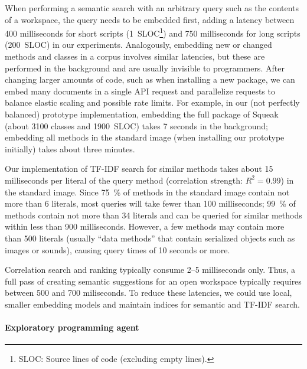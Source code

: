 When performing a semantic search with an arbitrary query such as the contents of a workspace, the query needs to be embedded first, adding a latency between 400 milliseconds for short scripts (\qty{1}{SLOC}\footnote{SLOC: Source lines of code (excluding empty lines).}) and 750 milliseconds for long scripts (\qty{200}{SLOC}) in our experiments.
Analogously, embedding new or changed methods and classes in a corpus involves similar latencies, but these are performed in the background and are usually invisible to programmers.
After changing larger amounts of code, such as when installing a new package, we can embed many documents in a single API request and parallelize requests to balance elastic scaling and possible rate limits.
For example, in our (not perfectly balanced) prototype implementation, embedding the full  package of Squeak (about \num{3100} classes and \qty{1900}{SLOC}) takes 7 seconds in the background; embedding all methods in the standard image (when installing our prototype initially) takes about three minutes.

Our implementation of TF-IDF search for similar methods takes about 15 milliseconds per literal of the query method (correlation strength: $R^2 = 0.99$) in the standard image.
Since \qty{75}{\percent} of methods in the standard image contain not more than 6 literals, most queries will take fewer than 100 milliseconds; \qty{99}{\percent} of methods contain not more than 34 literals and can be queried for similar methods within less than 900 milliseconds.
However, a few methods may contain more than 500 literals (usually ``data methods'' that contain serialized objects such as images or sounds), causing query times of 10 seconds or more.

Correlation search and ranking typically consume 2--5 milliseconds only.
Thus, a full pass of creating semantic suggestions for an open workspace typically requires between 500 and 700 miliseconds.
To reduce these latencies, we could use local, smaller embedding models and maintain indices for semantic and TF-IDF search.

\paragraph{Exploratory programming agent}
\label{par:discussion/performance/latencies/agent}

